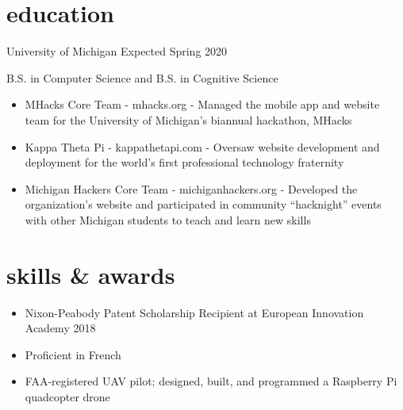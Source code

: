 \documentclass[]{template}
\begin{document}

\vspace{-12pt}
\section{education}

\begin{entrylist}


\entry
{University of Michigan}
{Expected Spring 2020}
{B.S. in Computer Science and B.S. in Cognitive Science\\

\vspace{-8pt}
\begin{itemize}[leftmargin=10pt, itemsep=-9pt, topsep=2pt]
    \item MHacks Core Team - mhacks.org - Managed the mobile app and website team for the University of Michigan's biannual hackathon, MHacks\\
	\item Kappa Theta Pi - kappathetapi.com - Oversaw website development and deployment for the world's first professional technology fraternity\\
	\item Michigan Hackers Core Team - michiganhackers.org - Developed the organization's website and participated in community ``hacknight'' events with other Michigan students to teach and learn new skills\\
\end{itemize}
}

\end{entrylist}


\vspace{-22pt}
\section{skills \& awards}
\begin{itemize}[leftmargin=10pt, itemsep=-16pt, topsep=0pt]
    \item Nixon-Peabody Patent Scholarship Recipient at European Innovation Academy 2018\\
    \item Proficient in French\\
    \item FAA-registered UAV pilot; designed, built, and programmed a Raspberry Pi quadcopter drone
\end{itemize}
\end{document}
